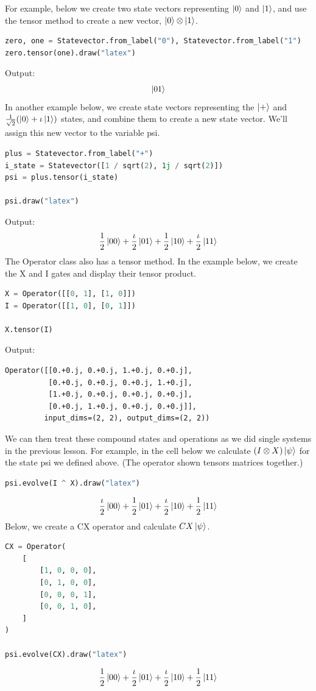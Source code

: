 For example, below we create two state vectors representing $\ket{0}$ and $\ket{1}$, and use the tensor method to create a new vector, $\ket{0}\otimes \ket{1}$.
\begin{lstlisting}[language=Python]
zero, one = Statevector.from_label("0"), Statevector.from_label("1")
zero.tensor(one).draw("latex")
\end{lstlisting}
Output:
\[
\ket{01}
\]
In another example below, we create state vectors representing the 
$\ket{+}$ and $\frac{1}{\sqrt{2}}(\ket{0}+\iota\ket{1})$ states, and combine them to create a new state vector. We'll assign this new vector to the variable psi.
\begin{lstlisting}[language=Python]
plus = Statevector.from_label("+")
i_state = Statevector([1 / sqrt(2), 1j / sqrt(2)])
psi = plus.tensor(i_state)

psi.draw("latex")
\end{lstlisting}
Output:
\[
\frac{1}{2}\ket{00}+\frac{\iota}{2}\ket{01}+\frac{1}{2}\ket{10}+\frac{\iota}{2}\ket{11}
\]
The Operator class also has a tensor method. In the example below, we create the X and I gates and display their tensor product.
\begin{lstlisting}[language=Python]
X = Operator([[0, 1], [1, 0]])
I = Operator([[1, 0], [0, 1]])

X.tensor(I)
\end{lstlisting}
Output:
\begin{lstlisting}
Operator([[0.+0.j, 0.+0.j, 1.+0.j, 0.+0.j],
          [0.+0.j, 0.+0.j, 0.+0.j, 1.+0.j],
          [1.+0.j, 0.+0.j, 0.+0.j, 0.+0.j],
          [0.+0.j, 1.+0.j, 0.+0.j, 0.+0.j]],
         input_dims=(2, 2), output_dims=(2, 2))
\end{lstlisting}
We can then treat these compound states and operations as we did single systems in the previous lesson. For example, in the cell below we calculate $(I\otimes X)\ket{\psi}$ for the state psi we defined above. (The operator shown tensors matrices together.)
\begin{lstlisting}[language=Python]
psi.evolve(I ^ X).draw("latex")
\end{lstlisting}
\[
\frac{\iota}{2}\ket{00}+\frac{1}{2}\ket{01}+\frac{\iota}{2}\ket{10}+\frac{1}{2}\ket{11}
\]
Below, we create a CX operator and calculate $CX\ket{\psi}$.
\begin{lstlisting}[language=Python]
CX = Operator(
    [
        [1, 0, 0, 0],
        [0, 1, 0, 0],
        [0, 0, 0, 1],
        [0, 0, 1, 0],
    ]
)

psi.evolve(CX).draw("latex")
\end{lstlisting}
\[
\frac{1}{2}\ket{00}+\frac{\iota}{2}\ket{01}+\frac{\iota}{2}\ket{10}+\frac{1}{2}\ket{11}
\]

